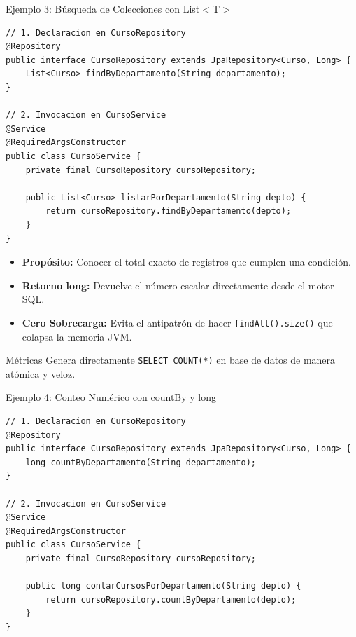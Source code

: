 \documentclass[aspectratio=169]{beamer}
\begin{document}
\begin{frame}[fragile]{Ejemplo 3: B\'usqueda de Colecciones con List$<$T$>$}
\begin{lstlisting}[style=SpringCodeStyle]
// 1. Declaracion en CursoRepository
@Repository
public interface CursoRepository extends JpaRepository<Curso, Long> {
    List<Curso> findByDepartamento(String departamento);
}

// 2. Invocacion en CursoService
@Service
@RequiredArgsConstructor
public class CursoService {
    private final CursoRepository cursoRepository;

    public List<Curso> listarPorDepartamento(String depto) {
        return cursoRepository.findByDepartamento(depto);
    }
}
\end{lstlisting}
\end{frame}

  {
    \begin{itemize}
      \item \textbf{Prop\'osito:} Conocer el total exacto de registros que cumplen una condici\'on.
      \item \textbf{Retorno long:} Devuelve el n\'umero escalar directamente desde el motor SQL.
      \item \textbf{Cero Sobrecarga:} Evita el antipatr\'on de hacer \texttt{findAll().size()} que colapsa la memoria JVM.
    \end{itemize}
  }
  {M\'etricas}
  {Genera directamente \texttt{SELECT COUNT(*)} en base de datos de manera at\'omica y veloz.}

\begin{frame}[fragile]{Ejemplo 4: Conteo Num\'erico con countBy y long}
\begin{lstlisting}[style=SpringCodeStyle]
// 1. Declaracion en CursoRepository
@Repository
public interface CursoRepository extends JpaRepository<Curso, Long> {
    long countByDepartamento(String departamento);
}

// 2. Invocacion en CursoService
@Service
@RequiredArgsConstructor
public class CursoService {
    private final CursoRepository cursoRepository;

    public long contarCursosPorDepartamento(String depto) {
        return cursoRepository.countByDepartamento(depto);
    }
}
\end{lstlisting}
\end{frame}
\end{document}
